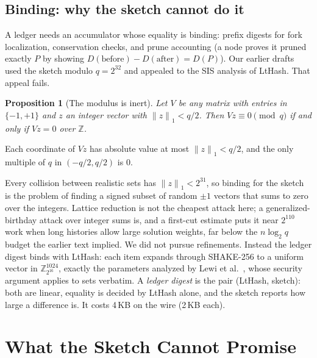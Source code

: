 \documentclass[journal]{IEEEtran}
\newtheorem{proposition}{Proposition}
\newcommand{\norm}[1]{\ensuremath{\lVert #1 \rVert}}
\begin{document}
\subsection{Binding: why the sketch cannot do it}

A ledger needs an accumulator whose equality is binding: prefix digests
for fork localization, conservation checks, and prune accounting
(a node proves it pruned exactly $P$ by showing $D(\mathrm{before}) -
D(\mathrm{after}) = D(P)$). Our earlier drafts used the sketch modulo
$q = 2^{32}$ and appealed to the SIS analysis of LtHash. That appeal
fails.

\begin{proposition}[The modulus is inert]
\label{prop:inert}
Let $V$ be any matrix with entries in $\{-1, +1\}$ and $z$ an integer
vector with $\norm{z}_{1} < q/2$. Then $Vz \equiv 0 \pmod q$ if and only
if $Vz = 0$ over $\mathbb{Z}$.
\end{proposition}

\begin{IEEEproof}
Each coordinate of $Vz$ has absolute value at most $\norm{z}_{1} < q/2$,
and the only multiple of $q$ in $(-q/2, q/2)$ is $0$.
\end{IEEEproof}

Every collision between realistic sets has $\norm{z}_{1} < 2^{31}$, so
binding for the sketch is the problem of finding a signed subset of
random $\pm 1$ vectors that sums to zero over the integers. Lattice
reduction is not the cheapest attack here; a generalized-birthday attack
over integer sums is, and a first-cut estimate puts it near $2^{110}$
work when long histories allow large solution weights, far below the
$n \log_{2} q$ budget the earlier text implied. We did not pursue
refinements. Instead the ledger digest binds with LtHash: each item
expands through SHAKE-256 to a uniform vector in
$\mathbb{Z}_{2^{16}}^{1024}$, exactly the parameters analyzed by Lewi et
al.~\cite{lewi2019lthash}, whose security argument applies to sets
verbatim. A \emph{ledger digest} is the pair (LtHash, sketch): both are
linear, equality is decided by LtHash alone, and the sketch reports how
large a difference is. It costs 4\,KB on the wire (2\,KB each).

\section{What the Sketch Cannot Promise}
\label{sec:security}
\end{document}
